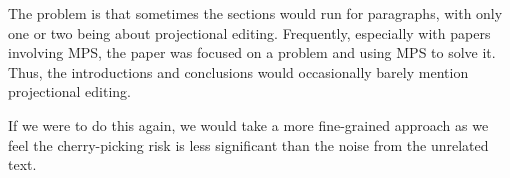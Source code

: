 The problem is that sometimes the sections would run for paragraphs, with only one or two being about projectional editing.
Frequently, especially with papers involving MPS, the paper was focused on a problem and using MPS to solve it.
Thus, the introductions and conclusions would occasionally barely mention projectional editing.

If we were to do this again, we would take a more fine-grained approach as we feel the cherry-picking risk is less significant than the noise from the unrelated text.
